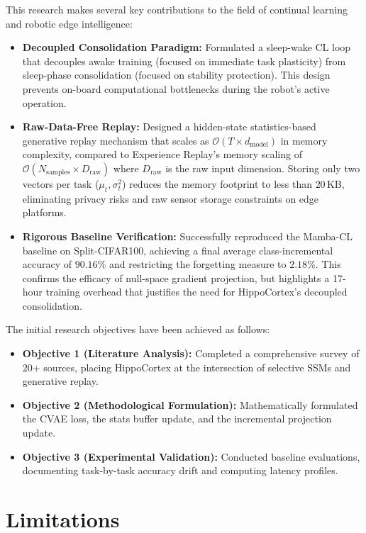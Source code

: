 This research makes several key contributions to the field of continual learning and robotic edge intelligence:
\begin{itemize}
    \item \textbf{Decoupled Consolidation Paradigm:} Formulated a sleep-wake CL loop that decouples awake training (focused on immediate task plasticity) from sleep-phase consolidation (focused on stability protection). This design prevents on-board computational bottlenecks during the robot's active operation.
    \item \textbf{Raw-Data-Free Replay:} Designed a hidden-state statistics-based generative replay mechanism that scales as $\mathcal{O}(T \times d_{\text{model}})$ in memory complexity, compared to Experience Replay's memory scaling of $\mathcal{O}(N_{\text{samples}} \times D_{\text{raw}})$ where $D_{\text{raw}}$ is the raw input dimension. Storing only two vectors per task ($\mu_t, \sigma_t^2$) reduces the memory footprint to less than $20$\,KB, eliminating privacy risks and raw sensor storage constraints on edge platforms.
    \item \textbf{Rigorous Baseline Verification:} Successfully reproduced the Mamba-CL baseline on Split-CIFAR100, achieving a final average class-incremental accuracy of $90.16\%$ and restricting the forgetting measure to $2.18\%$. This confirms the efficacy of null-space gradient projection, but highlights a 17-hour training overhead that justifies the need for HippoCortex's decoupled consolidation.
\end{itemize}

The initial research objectives have been achieved as follows:
\begin{itemize}
    \item \textbf{Objective 1 (Literature Analysis):} Completed a comprehensive survey of 20+ sources, placing HippoCortex at the intersection of selective SSMs and generative replay.
    \item \textbf{Objective 2 (Methodological Formulation):} Mathematically formulated the CVAE loss, the stats buffer update, and the incremental projection update.
    \item \textbf{Objective 3 (Experimental Validation):} Conducted baseline evaluations, documenting task-by-task accuracy drift and computing latency profiles.
\end{itemize}

\section{Limitations}
\label{sec:limitations}

